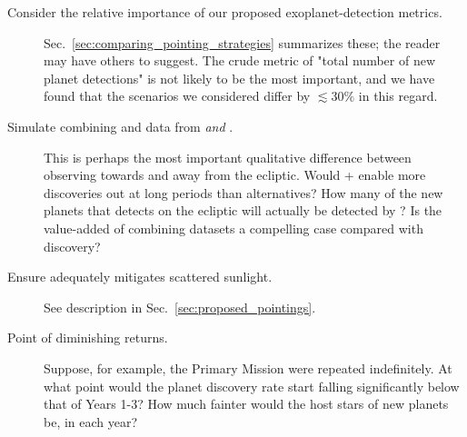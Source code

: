 \begin{description}
	\item[Consider the relative importance of our proposed exoplanet-detection 
	metrics.]
	Sec.~\ref{sec:comparing_pointing_strategies} summarizes these; the reader 
	may have others to suggest. The crude metric of "total number of new planet 
	detections" is not
	likely to be the most important, and we have found that the scenarios we considered
	differ by $\lesssim30\%$ in
          this regard. 
	
	\item[Simulate combining \tess and \ktwo data from
          \rm{\elong\:} \textit{and} \rm{\eshort}.]  This is perhaps
          the most important qualitative difference between observing
          towards and away from the ecliptic.  Would \tess\!+\ktwo
          enable more discoveries out at long periods than
          alternatives?  How many of the new planets that \tess
          detects on the ecliptic will actually be detected by \ktwo?
          Is the value-added of combining datasets a compelling case
          compared with discovery?
          
    \item[Ensure {\rm \npole} adequately mitigates scattered sunlight.]
    See description in Sec.~\ref{sec:proposed_pointings}.
	
    \item[Point of diminishing returns.] Suppose, for example, the Primary Mission were repeated indefinitely.
    At what point would the planet discovery rate start falling significantly below that of Years 1-3?
    How much fainter would the host stars of new planets be, in each year?
	
\end{description}
